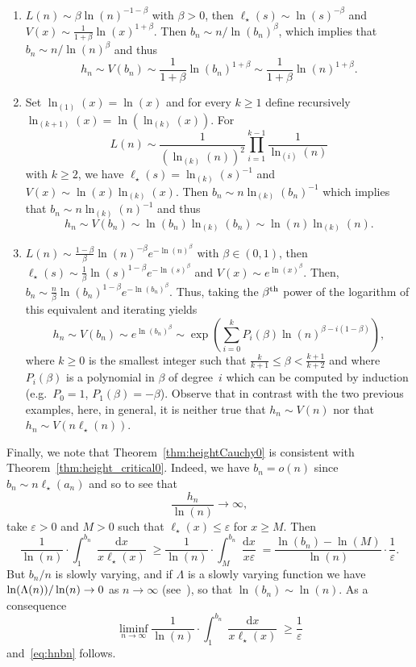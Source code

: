 \documentclass[AHL,Unicode,longabstracts,published]{cedram}
\DeclareMathOperator{\dxseq}{d\mathit{x}}
\begin{document}
\begin{enumerate}
\item $L(n) \sim \beta \ln(n)^{-1-\beta} $ with $\beta>0$, then $\ell_{\star}(s) \sim \ln(s)^{-\beta}$ and $V(x) \sim \frac{1}{1+\beta} \ln(x)^{1+\beta}$. Then $ b_{n} \sim n/\ln(b_{n})^{\beta}$, which implies that $ b_{n} \sim n/\ln(n)^{\beta}$ and thus
\[
h_{n}  \sim  V(b_{n})  \sim  \frac{1}{1+\beta} \ln(b_{n})^{1+\beta}  \sim \frac{1}{1+\beta} \ln(n)^{1+\beta}.
\]

\item Set $\ln_{(1)}(x)=\ln(x)$ and for every $k \geq 1$ define recursively $\ln_{(k+1)} (x) = \ln(\ln_{(k)}(x))$. For
\[
L(n)  \sim  \frac{1}{(\ln_{(k)}(n))^{2}} \prod_{i=1}^{k-1} \frac{1}{\ln_{(i)}(n) }
\]
with $k \geq 2$, we have $\ell_{\star}(s)=\ln_{(k)}(s)^{-1}$ and $V(x) \sim \ln(x) \ln_{(k)}(x)$. Then $ b_{n} \sim n \ln_{(k)}(b_{n})^{-1}$ which implies that $ b_{n} \sim n \ln_{(k)}(n)^{-1}$ and thus
\[
h_{n}  \sim  V(b_{n})  \sim  \ln(b_{n}) \ln_{(k)}(b_{n})  \sim  \ln(n) \ln_{(k)}(n).
\]
\item $L(n) \sim \frac{1-\beta}{\beta} \ln(n)^{-\beta} e^{-\ln(n)^{\beta}} $ with $\beta \in (0,1)$, then $\ell_{\star}(s) \sim \frac{1}{\beta} \ln(s)^{1-\beta} e^{-\ln(s)^{\beta}} $ and $V(x) \sim e^{\ln(x)^{\beta}}$. Then, $ b_{n} \sim \frac{n}{\beta} \ln(b_{n})^{1-\beta} e^{-\ln(b_{n})^{\beta}} $. Thus, taking the $\beta^{\text{\normalfont th}}$ power of the logarithm of this equivalent and iterating yields
\[
h_{n}  \sim  V(b_{n})  \sim  e^{\ln(b_{n})^{\beta}}  \sim  \exp \left(\sum_{i=0}^{k} P_{i}(\beta) \ln(n)^{\beta-i(1-\beta)} \right),
\]
where $k \geq 0$ is the smallest integer such that $ \frac{k}{k+1} \leq \beta < \frac{k+1}{k+2}$ and where $P_{i}(\beta)$ is a polynomial in $\beta$ of degree~$i$ which can be computed by induction (e.g.~$P_{0}=1$, $P_{1}(\beta)=-\beta$). Observe that in contrast with the two previous examples, here, in general, it is neither true that $h_{n} \sim V(n)$ nor that $h_{n} \sim V(n \ell_{\star}(n))$.
\end{enumerate}

Finally, we note that Theorem~\ref{thm:heightCauchy0} is consistent with Theorem~\ref{thm:height_critical0}. Indeed, we have $b_{n}=o(n)$ since $ b_{n} \sim n \ell_{\star}(a_{n})$ and so to see that
\begin{equation}\label{eq:hnbn}
\frac{h_{n}}{\ln(n)} \longrightarrow \infty,
\end{equation}
take $\varepsilon>0$ and $M>0$ such that $\ell_{\star}(x) \leq \varepsilon$ for $x \geq M$. Then
\[
\frac{1}{\ln(n)} \cdot \int_{1}^{ b_{n} } \frac{ \dxseq}{x \ell_{\star}(x)} \geq \frac{1}{\ln(n)} \cdot \int_{M}^{ b_{n} } \frac{\dxseq}{x \varepsilon} = \frac{\ln(b_{n})-\ln(M)}{\ln(n)} \cdot \frac{1}{\varepsilon}.
\]
But $ b_{n} /n$ is slowly varying, and if $\Lambda$ is a slowly varying function we have $\ln(\Lambda(n))/\linebreak\ln(n) \rightarrow 0$ as $n \rightarrow \infty$ (see~\cite[Proposition~1.3.6(i)]{BGT89}), so that $\ln(b_{n}) \sim \ln(n)$. As a consequence
\[
\liminf_{n \rightarrow \infty} \frac{1}{\ln(n)} \cdot \int_{1}^{ b_{n} } \frac{\dxseq}{x \ell_{\star}(x)} \geq \frac{1}{\varepsilon}
\]
and~\eqref{eq:hnbn} follows.
\end{document}
